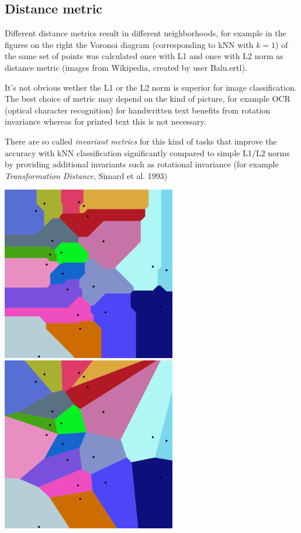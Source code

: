 \subsection{Distance metric}
%
\begin{minipage}{0.8\textwidth}
Different distance metrics result in different neighborhoods, for example in the figures on the right the Voronoi diagram (corresponding to kNN with $k=1$) of the same set of points was calculated once with L1 and once with L2 norm as distance metric (images from Wikipedia, created by user Balu.ertl).

It's not obvious wether the L1 or the L2 norm is superior for image classification. The best choice of metric may depend on the kind of picture, for example OCR (optical character recognition) for handwritten text benefits from rotation invariance whereas for printed text this is not necessary.

There are so called \textit{invariant metrics} for this kind of tasks that improve the accuracy with kNN classification significantly compared to simple L1/L2 norms by providing additional invariants such as rotational invariance (for example \textit{Transformation Distance}, Simard et al. 1993)
\end{minipage}
%
\begin{minipage}{0.3\textwidth}
\centering

\includegraphics[width=0.57\textwidth]{./img/voroL1.png}
\includegraphics[width=0.57\textwidth]{./img/voroL2.png}
\end{minipage}


